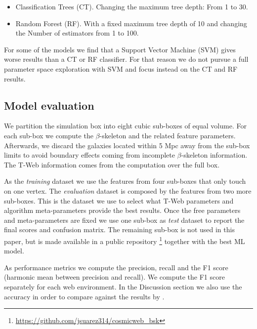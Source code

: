 \documentclass[usenatbib]{mnras}
\begin{document}
\begin{itemize}
    \item Classification Trees (CT). Changing the maximum tree depth: From 1 to 30.
    \item Random Forest (RF). With a fixed maximum tree depth of 10 and changing the Number of estimators from 1 to 100.
\end{itemize}

For some of the models we find that a Support Vector Machine (SVM) gives worse results than a CT or RF classifier.
For that reason we do not pursue a full parameter space exploration with SVM and focus instead on the CT and RF results.


\subsection{Model evaluation}

We partition the simulation box into eight cubic sub-boxes of equal volume.
For each sub-box we compute the $\beta$-skeleton and the related feature parameters.
Afterwards, we discard the galaxies located within 5 Mpc away from the sub-box limits to avoid boundary effects coming from incomplete $\beta$-skeleton information.
The T-Web information comes from the computation over the full box.

As the \emph{training} dataset we use the features from four sub-boxes that only touch on one vertex.
The \emph{evaluation} dataset is composed by the features from two more sub-boxes.
This is the dataset we use to select what T-Web parameters and algorithm meta-parameters provide the best results.
Once the free parameters and meta-parameters are fixed we use one sub-box as \emph{test} dataset to report the final scores and confusion matrix.
The remaining sub-box is not used in this paper, but is made available in a public repository \footnote{\url{https://github.com/jsuarez314/cosmicweb_bsk}} together with the best ML model. 


As performance metrics we compute the precision, recall and the F1
score (harmonic mean between precision and recall).  
We compute the F1 score separately for each web environment.
In the Discussion section we also use the accuracy in order to compare against the results by \cite{Tsizh2019}.
\end{document}
